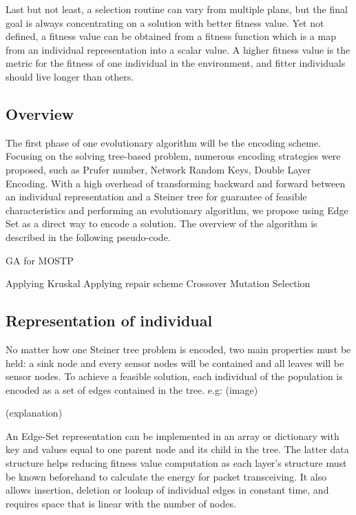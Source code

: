 Last but not least, a selection routine can vary from multiple plans, but the final goal is always concentrating on a solution with better fitness value. Yet not defined, a fitness value can be obtained from a fitness function which is a map from an individual representation into a scalar value. A higher fitness value is the metric for the fitness of one individual in the environment, and fitter individuals should live longer than others.

\subsection{Overview}
The first phase of one evolutionary algorithm will be the encoding scheme. Focusing on the solving tree-based problem, numerous encoding strategies were proposed, such as Prufer number, Network Random Keys, Double Layer Encoding. With a high overhead of transforming backward and forward between an individual representation and a Steiner tree for guarantee of feasible characteristics and performing an evolutionary algorithm, we propose using Edge Set as a direct way to encode a solution. The overview of the algorithm is described in the following pseudo-code.

\begin{algorithm}
\caption{GA for MOSTP}
\begin{algorithmic}[1]
	\State Applying Kruskal
	\State Applying repair scheme
\EndFor
{}
	\State Crossover
	\State Mutation
	\State Selection
\EndWhile
\end{algorithmic}
\end{algorithm}

\subsection{Representation of individual}
No matter how one Steiner tree problem is encoded, two main properties must be held: a sink node and every sensor nodes will be contained and all leaves will be sensor nodes. To achieve a feasible solution, each individual of the population is encoded as a set of edges contained in the tree.
e.g: (image)

(explanation)

An Edge-Set representation can be implemented in an array or dictionary with key and values equal to one parent node and its child in the tree. The latter data structure helps reducing fitness value computation as each layer’s structure must be known beforehand to calculate the energy for packet transceiving. It also allows insertion, deletion or lookup of individual edges in constant time, and requires space that is linear with the number of nodes.

